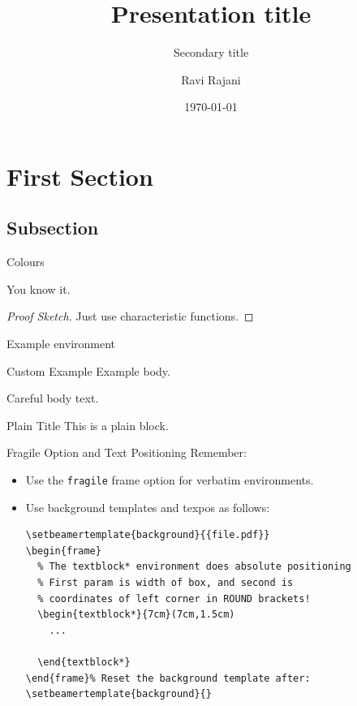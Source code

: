 \documentclass[notes=onslide]{slides} %
\title
{Presentation title}
\subtitle
{Secondary title}
\author
{Ravi Rajani}
\institute
{Department of Mathematics}
\date{\today}
\begin{document}
\begin{frame}
  \titlepage
\end{frame}


\section{First Section}

\subsection{Subsection}

\begin{frame}{Colours}
\begin{theorem}
You know it. 
\end{theorem}
\begin{proof}[Proof Sketch]
Just use characteristic functions.
\end{proof}
\begin{example}
Example environment
\end{example}
\begin{minipage}{.5\textwidth}
  \begin{exampleblock}{Custom Example}
    Example body.
    \end{exampleblock}
\end{minipage}
\begin{alertblock}{Careful}
  body text.
\end{alertblock}
\begin{plainblock}{Plain Title}
This is a plain block.
\end{plainblock}
\end{frame}

\begin{frame}[fragile]{Fragile Option and Text Positioning}
    Remember:
    \begin{itemize}[<+->]
      \item Use the \texttt{fragile} frame option for \textcolor<2->{OUMidBlue}{verbatim} environments.
      \item Use \colorbox{OUYellow}{background templates} and \alert{texpos} as follows:
            \begin{verbatim}
\setbeamertemplate{background}{{file.pdf}}
\begin{frame}
  % The textblock* environment does absolute positioning
  % First param is width of box, and second is
  % coordinates of left corner in ROUND brackets!
  \begin{textblock*}{7cm}(7cm,1.5cm)
    ...
    
  \end{textblock*}
\end{frame}% Reset the background template after:
\setbeamertemplate{background}{}
\end{verbatim}
    \end{itemize}
\end{frame}
\end{document}
